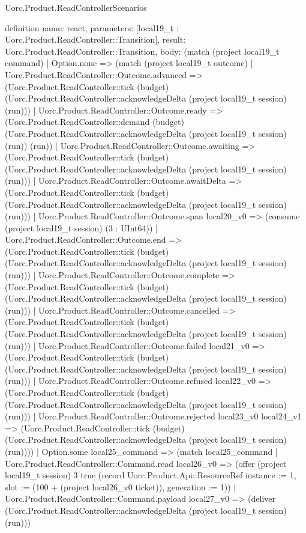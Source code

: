 \begin{lexlean}{Uorc.Product.ReadControllerScenarios}
\begin{semanticmodule}
definition{
  name: react,
  parameters: [local19_t : Uorc.Product.ReadController::Transition],
  result: Uorc.Product.ReadController::Transition,
  body: (match (project local19_t command)
    | Option.none => (match (project local19_t outcome)
      | Uorc.Product.ReadController::Outcome.advanced => (Uorc.Product.ReadController::tick (budget) (Uorc.Product.ReadController::acknowledgeDelta (project local19_t session) (run)))
      | Uorc.Product.ReadController::Outcome.ready => (Uorc.Product.ReadController::demand (budget) (Uorc.Product.ReadController::acknowledgeDelta (project local19_t session) (run)) (run))
      | Uorc.Product.ReadController::Outcome.awaiting => (Uorc.Product.ReadController::tick (budget) (Uorc.Product.ReadController::acknowledgeDelta (project local19_t session) (run)))
      | Uorc.Product.ReadController::Outcome.awaitDelta => (Uorc.Product.ReadController::tick (budget) (Uorc.Product.ReadController::acknowledgeDelta (project local19_t session) (run)))
      | Uorc.Product.ReadController::Outcome.span local20_v0 => (consume (project local19_t session) (3 : UInt64))
      | Uorc.Product.ReadController::Outcome.end => (Uorc.Product.ReadController::tick (budget) (Uorc.Product.ReadController::acknowledgeDelta (project local19_t session) (run)))
      | Uorc.Product.ReadController::Outcome.complete => (Uorc.Product.ReadController::tick (budget) (Uorc.Product.ReadController::acknowledgeDelta (project local19_t session) (run)))
      | Uorc.Product.ReadController::Outcome.cancelled => (Uorc.Product.ReadController::tick (budget) (Uorc.Product.ReadController::acknowledgeDelta (project local19_t session) (run)))
      | Uorc.Product.ReadController::Outcome.failed local21_v0 => (Uorc.Product.ReadController::tick (budget) (Uorc.Product.ReadController::acknowledgeDelta (project local19_t session) (run)))
      | Uorc.Product.ReadController::Outcome.refused local22_v0 => (Uorc.Product.ReadController::tick (budget) (Uorc.Product.ReadController::acknowledgeDelta (project local19_t session) (run)))
      | Uorc.Product.ReadController::Outcome.rejected local23_v0 local24_v1 => (Uorc.Product.ReadController::tick (budget) (Uorc.Product.ReadController::acknowledgeDelta (project local19_t session) (run))))
    | Option.some local25_command => (match local25_command
      | Uorc.Product.ReadController::Command.read local26_v0 => (offer (project local19_t session) 3 true (record Uorc.Product.Api::ResourceRef {instance := 1, slot := (100 + (project local26_v0 ticket)), generation := 1}))
      | Uorc.Product.ReadController::Command.payload local27_v0 => (deliver (Uorc.Product.ReadController::acknowledgeDelta (project local19_t session) (run)))
}
\end{semanticmodule}
\end{lexlean}
